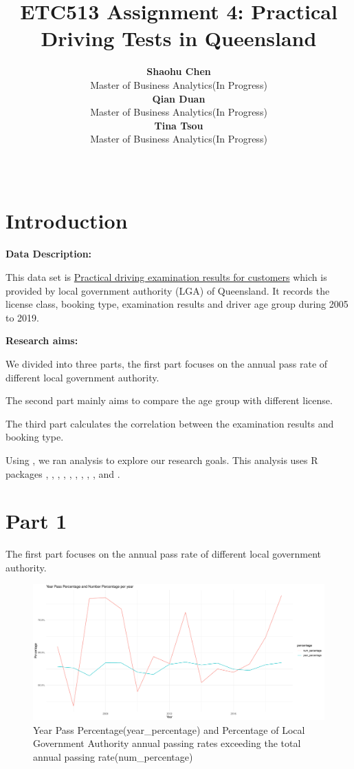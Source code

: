 \documentclass[11pt,a4paper,]{article}
\title{ETC513 Assignment 4: Practical Driving Tests in Queensland}
\author{\sf\Large\textbf{ Shaohu Chen}\\ {\sf\large Master of Business Analytics(In Progress)\\[0.5cm]} \sf\Large\textbf{ Qian Duan}\\ {\sf\large Master of Business Analytics(In Progress)\\[0.5cm]} \sf\Large\textbf{ Tina Tsou}\\ {\sf\large Master of Business Analytics(In Progress)\\[0.5cm]}}
\date{\sf\Date~\Month~\Year}
\makeatletter
\def\titlepage{\front{\expandafter{\@title}}{\@author}{\@organization}}
\makeatother
\begin{document}
\titlepage

\section*{Introduction}

\textbf{Data Description:}

This data set is \href{https://data.gov.au/dataset/ds-qld-3f90a4c3-23df-49dc-b243-9a29c0b23dd5/details?q=Practical\%20driving}{Practical driving examination results for customers} which is provided by local government authority (LGA) of Queensland. It records the license class, booking type, examination results and driver age group during 2005 to 2019.

\textbf{Research aims:}

We divided into three parts, the first part focuses on the annual pass rate of different local government authority.

The second part mainly aims to compare the age group with different license.

The third part calculates the correlation between the examination results and booking type.

Using \textcite{R}, we ran analysis to explore our research goals. This analysis uses R packages \textcite{tidyverse}, \textcite{readr}, \textcite{kableExtra}, \textcite{bookdown}, \textcite{ggplot2}, \textcite{fastDummies}, \textcite{scales}, \textcite{stargazer}, \textcite{broom}, and \textcite{pROC}.

\section*{Part 1}

The first part focuses on the annual pass rate of different local government authority.

\begin{figure}
\centering
\includegraphics{Assignment4_files/figure-latex/Fig1-1.pdf}
\caption{\label{fig:Fig1}Year Pass Percentage(year\_percentage) and Percentage of Local Government Authority annual passing rates exceeding the total annual passing rate(num\_percentage)}
\end{figure}
\end{document}
